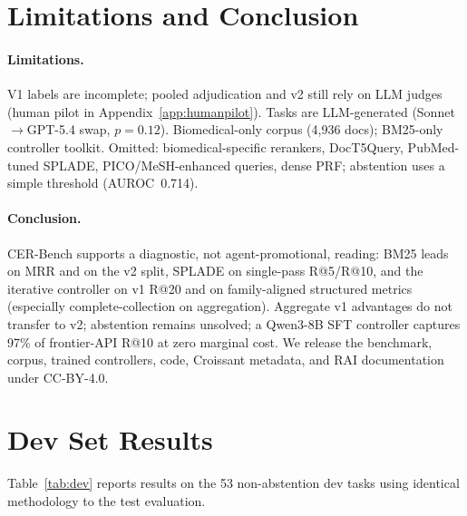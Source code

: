\documentclass{article}
\begin{document}
\section{Limitations and Conclusion}
\label{sec:limitations}

\paragraph{Limitations.} V1 labels are incomplete; pooled adjudication and v2 still rely on LLM judges (human pilot in Appendix~\ref{app:humanpilot}). Tasks are LLM-generated (Sonnet$\to$GPT-5.4 swap, $p{=}0.12$). Biomedical-only corpus (4{,}936 docs); BM25-only controller toolkit. Omitted: biomedical-specific rerankers, DocT5Query, PubMed-tuned SPLADE, PICO/MeSH-enhanced queries, dense PRF; abstention uses a simple threshold (AUROC~0.714).


\paragraph{Conclusion.} CER-Bench supports a diagnostic, not agent-promotional, reading: BM25 leads on MRR and on the v2 split, SPLADE on single-pass R@5/R@10, and the iterative controller on v1 R@20 and on family-aligned structured metrics (especially complete-collection on aggregation). Aggregate v1 advantages do not transfer to v2; abstention remains unsolved; a Qwen3-8B SFT controller captures 97\% of frontier-API R@10 at zero marginal cost. We release the benchmark, corpus, trained controllers, code, Croissant metadata, and RAI documentation under CC-BY-4.0.





\newpage
\appendix

\section{Dev Set Results}
\label{app:dev}

Table~\ref{tab:dev} reports results on the 53 non-abstention dev tasks using identical methodology to the test evaluation.
\end{document}
